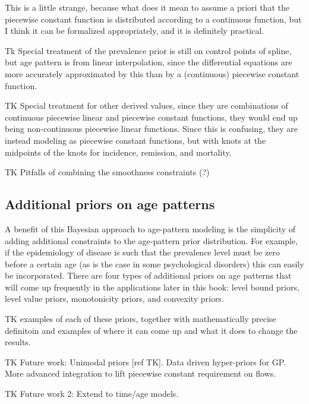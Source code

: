 This is a little strange, because what does it mean to assume a priori
that the piecewise constant function is distributed according to a
continuous function, but I think it can be formalized appropriately,
and it is definitely practical.

Tk Special treatment of the prevalence prior is still on control
points of spline, but age pattern is from linear interpolation, since
the differential equations are more accurately approximated by this
than by a (continuous) piecewise constant function.

TK Special treatment for other derived values, since they are
combinations of continuous piecewise linear and piecewise constant
functions, they would end up being non-continuous piecewise linear
functions.  Since this is confusing, they are instead modeling as
piecewise constant functions, but with knots at the midpoints of the
knots for incidence, remission, and mortality.

TK Pitfalls of combining the smoothness constraints (?)

\subsection{Additional priors on age patterns}
A benefit of this Bayesian approach to age-pattern modeling is the
simplicity of adding additional constraints to the age-pattern prior
distribution.  For example, if the epidemiology of disease is such
that the prevalence level must be zero before a certain age (as is the
case in some psychological disorders) this can easily be incorporated.
There are four types of additional priors on age patterns that will
come up frequently in the applications later in this book: level bound
priors, level value priors, monotonicity priors, and convexity priors.

TK examples of each of these priors, together with mathematically
precise definitoin and examples of where it can come up and what it
does to change the results.

TK Future work: Unimodal priors [ref TK].  Data driven hyper-priors
for GP.  More advanced integration to lift piecewise constant
requirement on flows.

TK Future work 2: Extend to time/age models.

